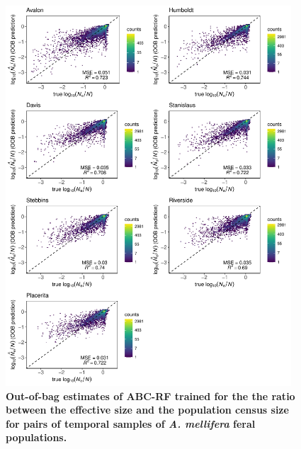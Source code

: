 \documentclass[a4paper, 12pt]{article}
\begin{document}
\begin{figure}[ht]
  \centering
  \includegraphics[width=0.95\textwidth]{Figures/FigureS24_combined_plot_nenc.pdf}
  \small\caption{\textbf{Out-of-bag estimates of ABC-RF trained for the the ratio between the effective size and the population census size for pairs of temporal samples of \textit{A. mellifera} feral populations.}}
  \label{fig:supple_feralbee_nen}
\end{figure}
\end{document}
